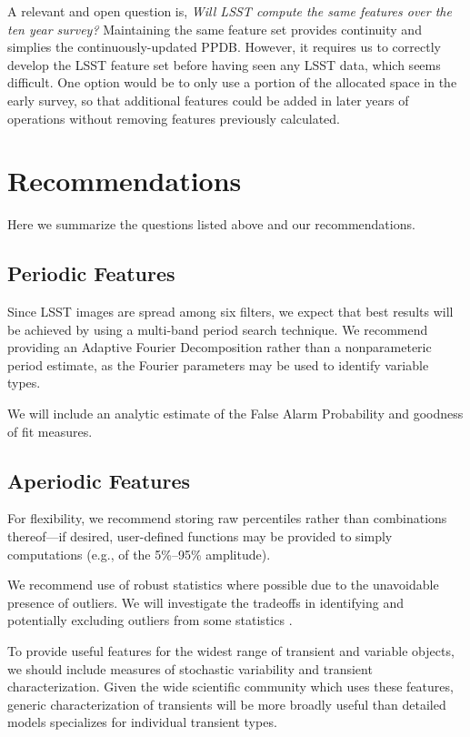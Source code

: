 \documentclass[DM,authoryear,toc]{lsstdoc}
\begin{document}
A relevant and open question is, \textit{Will LSST compute the same features over the ten year survey?}
Maintaining the same feature set provides continuity and simplies the continuously-updated PPDB.
However, it requires us to correctly develop the LSST feature set before having seen any LSST data, which seems difficult.
One option would be to only use a portion of the allocated space in the early survey, so that additional features could be added in later years of operations without removing features previously calculated.

\section{Recommendations}

Here we summarize the questions listed above and our recommendations.

\subsection{Periodic Features}

Since LSST images are spread among six filters, we expect that best results will be achieved by using a multi-band period search technique.
We recommend providing an Adaptive Fourier Decomposition rather than a nonparameteric period estimate, as the Fourier parameters may be used to identify variable types.

We will include an analytic estimate of the False Alarm Probability \citep[e.g.,][]{Baluev:08:FAP, Delisle:20:LSFAPCorrelatedNoise} and goodness of fit measures.

\subsection{Aperiodic Features}

For flexibility, we recommend storing raw percentiles rather than combinations thereof---if desired, user-defined functions may be provided to simply computations (e.g., of the 5\%--95\% amplitude).

We recommend use of robust statistics where possible due to the unavoidable presence of outliers.
We will investigate the tradeoffs in identifying and potentially excluding outliers from some statistics \citep[e.g.,][]{Pashchenko:18:OGLEClassification}.

To provide useful features for the widest range of transient and variable objects, we should include measures of stochastic variability and transient characterization.
Given the wide scientific community which uses these features, generic characterization of transients will be more broadly useful than detailed models specializes for individual transient types.
\end{document}
